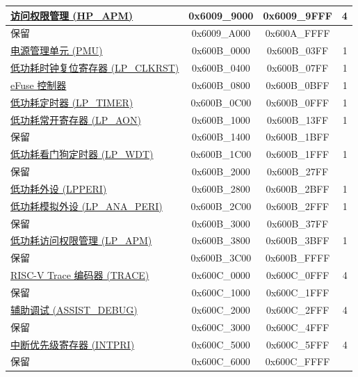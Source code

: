 \begin{ThreePartTable}
\begin{longtable}[c]{ |p{7cm}|c|c|r| }
\hyperref[mod:permctrl]{访问权限管理 (HP\_APM)}\tnote{\textcolor{red}{*}}                      & 0x6009\_9000 & 0x6009\_9FFF &   4 \\\hline
    \rowcolor{gray!25}  保留                    & 0x6009\_A000 & 0x600A\_FFFF &         \\\hline
\hyperref[mod:lowpowm]{电源管理单元 (PMU)} & 0x600B\_0000 & 0x600B\_03FF &   1     \\\hline
\hyperref[mod:resclk]{低功耗时钟复位寄存器 (LP\_CLKRST)}                  & 0x600B\_0400 & 0x600B\_07FF &   1     \\\hline
\hyperref[mod:efuse]{eFuse 控制器}                       & 0x600B\_0800 & 0x600B\_0BFF &   1     \\\hline
\hyperref[mod:lowpowm]{低功耗定时器 (LP\_TIMER)}                   & 0x600B\_0C00 & 0x600B\_0FFF &   1     \\\hline
\hyperref[mod:lowpowm]{低功耗常开寄存器 (LP\_AON)}                     & 0x600B\_1000 & 0x600B\_13FF &   1     \\\hline
    \rowcolor{gray!25}  保留                    & 0x600B\_1400 & 0x600B\_1BFF &         \\\hline
\hyperref[mod:wdt]{低功耗看门狗定时器 (LP\_WDT)}                     & 0x600B\_1C00 & 0x600B\_1FFF &   1     \\\hline
    \rowcolor{gray!25}  保留                    & 0x600B\_2000 & 0x600B\_27FF &         \\\hline
\hyperref[mod:resclk]{低功耗外设 (LPPERI)}                      & 0x600B\_2800 & 0x600B\_2BFF &   1     \\\hline
\hyperref[mod:lowpowm]{低功耗模拟外设 (LP\_ANA\_PERI)}               & 0x600B\_2C00 & 0x600B\_2FFF &   1     \\\hline
    \rowcolor{gray!25}  保留                    & 0x600B\_3000 & 0x600B\_37FF &         \\\hline
\hyperref[mod:permctrl]{低功耗访问权限管理 (LP\_APM)}\tnote{\textcolor{red}{*}}                     & 0x600B\_3800 & 0x600B\_3BFF &   1     \\\hline
    \rowcolor{gray!25}  保留                    & 0x600B\_3C00 & 0x600B\_FFFF &         \\\hline
\hyperref[mod:riscvtracenc]{RISC-V Trace 编码器 (TRACE)}                       & 0x600C\_0000 & 0x600C\_0FFF &   4     \\\hline
    \rowcolor{gray!25}  保留                    & 0x600C\_1000 & 0x600C\_1FFF &         \\\hline
\hyperref[mod:dbgassist]{辅助调试 (ASSIST\_DEBUG)\tnote{\textcolor{red}{*}}}               & 0x600C\_2000 & 0x600C\_2FFF &   4     \\\hline
    \rowcolor{gray!25}  保留                    & 0x600C\_3000 & 0x600C\_4FFF &         \\\hline
\hyperref[mod:riscvcpu]{中断优先级寄存器 (INTPRI)}                & 0x600C\_5000 & 0x600C\_5FFF &   4     \\\hline
    \rowcolor{gray!25}  保留                    & 0x600C\_6000 & 0x600C\_FFFF &         \\\hline


\end{longtable}
\end{ThreePartTable}
